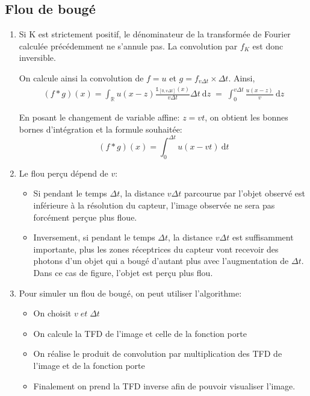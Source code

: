 \documentclass{article}
\begin{document}
\subsection{Flou de bougé}
\begin{enumerate}
\item Si K est strictement positif, le dénominateur de la transformée de Fourier calculée précédemment ne s'annule pas. La convolution par $f_K$ est donc inversible.

On calcule ainsi la convolution de $f = u$ et $g =f_{v \Delta t} \times \Delta t $. Ainsi,
\begin{equation*}\begin{split}
(f * g)(x) = \int_\mathbb{R} u(x-z)\frac{\mathds{1}_{[0, v \Delta t]}(x)}{v \Delta t} \Delta t \:\mathrm{d}z \; = \;   \int_{0}^{v \Delta t} \frac{u(x-z)}{v} \:\mathrm{d}z
\end{split}\end{equation*}

En posant le changement de variable affine: $ z=v t $, on obtient les bonnes bornes d'intégration et la formule souhaitée:
$$(f * g)(x) = \int_{0}^{\Delta t} u(x-vt)\:\mathrm{d}t$$
\item Le flou perçu dépend de $v$:

\begin{itemize}
\item Si pendant le temps $\Delta t$, la distance $v \Delta t$ parcourue par l'objet observé est inférieure à la résolution du capteur, l'image observée ne sera pas forcément perçue plus floue.
\item Inversement, si pendant le temps $\Delta t$, la distance $v \Delta t$ est suffisamment importante, plus les zones réceptrices du capteur vont recevoir des photons d'un objet qui a bougé d'autant plus avec l'augmentation de $\Delta t$. Dans ce cas de figure, l'objet est perçu plus flou.
\end{itemize}

\item Pour simuler un flou de bougé, on peut utiliser l'algorithme:
\begin{itemize}
\item On choisit $v \; et \; \Delta t$ 
\item On calcule la TFD de l'image et celle de la fonction porte
\item On réalise le produit de convolution par multiplication des TFD de l'image et de la fonction porte
\item Finalement on prend la TFD inverse afin de pouvoir visualiser l'image.
\end{itemize}

\end{enumerate}
\end{document}
